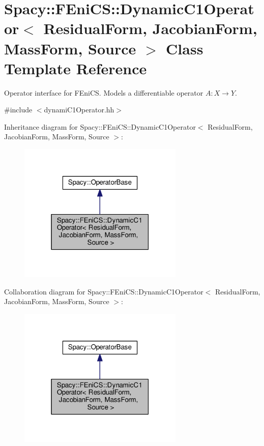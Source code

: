 \hypertarget{classSpacy_1_1FEniCS_1_1DynamicC1Operator}{}\section{Spacy\+:\+:F\+Eni\+C\+S\+:\+:Dynamic\+C1\+Operator$<$ Residual\+Form, Jacobian\+Form, Mass\+Form, Source $>$ Class Template Reference}
\label{classSpacy_1_1FEniCS_1_1DynamicC1Operator}


Operator interface for F\+Eni\+C\+S. Models a differentiable operator $A:X\rightarrow Y$.  




{\ttfamily \#include $<$dynami\+C1\+Operator.\+hh$>$}



Inheritance diagram for Spacy\+:\+:F\+Eni\+C\+S\+:\+:Dynamic\+C1\+Operator$<$ Residual\+Form, Jacobian\+Form, Mass\+Form, Source $>$\+:\nopagebreak
\begin{figure}[H]
\begin{center}
\leavevmode
\includegraphics[width=223pt]{classSpacy_1_1FEniCS_1_1DynamicC1Operator__inherit__graph}
\end{center}
\end{figure}


Collaboration diagram for Spacy\+:\+:F\+Eni\+C\+S\+:\+:Dynamic\+C1\+Operator$<$ Residual\+Form, Jacobian\+Form, Mass\+Form, Source $>$\+:\nopagebreak
\begin{figure}[H]
\begin{center}
\leavevmode
\includegraphics[width=223pt]{classSpacy_1_1FEniCS_1_1DynamicC1Operator__coll__graph}
\end{center}
\end{figure}
